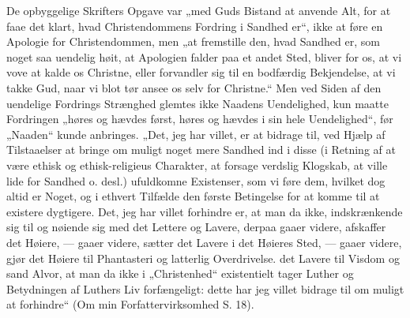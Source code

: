 \documentclass[12pt,a4paper]{book}
\begin{document}
De opbyggelige Skrifters Opgave var „med Guds Bistand at anvende Alt, for at faae det klart, hvad Christendommens Fordring i Sandhed er“, ikke at føre en Apologie for Christendommen, men „at fremstille den, hvad Sandhed er, som noget saa uendelig høit, at Apologien falder paa et andet Sted, bliver for os, at vi vove at kalde os Christne, eller forvandler sig til en bodfærdig Bekjendelse, at vi takke Gud, naar vi blot tør ansee os selv for Christne.“ Men ved Siden af den uendelige Fordrings Strænghed glemtes ikke Naadens Uendelighed, kun maatte Fordringen „høres og hævdes først, høres og hævdes i sin hele Uendelighed“, før „Naaden“ kunde anbringes. „Det, jeg har villet, er at bidrage til, ved Hjælp af Tilstaaelser at bringe om muligt noget mere Sandhed ind i disse (i Retning af at være ethisk og ethisk-religieus Charakter, at forsage verdslig Klogskab, at ville lide for Sandhed o. desl.) ufuldkomne Existenser, som vi føre dem, hvilket dog altid er Noget, og i ethvert Tilfælde den første Betingelse for at komme til at existere dygtigere. Det, jeg har villet forhindre er, at man da ikke, indskrænkende sig til og nøiende sig med det Lettere og Lavere, derpaa gaaer videre, afskaffer det Høiere, --- gaaer videre, sætter det Lavere i det Høieres Sted, --- gaaer videre, gjør det Høiere til Phantasteri og latterlig Overdrivelse. det Lavere til Visdom og sand Alvor, at man da ikke i „Christenhed“ existentielt tager Luther og Betydningen af Luthers Liv forfængeligt: dette har jeg villet bidrage til om muligt at forhindre“ (Om min Forfattervirksomhed S. 18).
\end{document}
